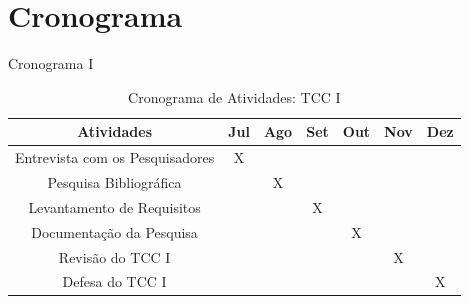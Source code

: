 

\section{Cronograma}
\label{sec:cronograma}

\begin{frame}{Cronograma I}
	\begin{table}[h]
		\caption*{Cronograma de Atividades: TCC I}
		\centering
		\begin{tabular}{c c c c c c c} \hline
			\label{quad:cronograma-atividades-i}
			\textbf{Atividades}             & \textbf{Jul} & \textbf{Ago} & \textbf{Set} & \textbf{Out} & \textbf{Nov} & \textbf{Dez} \\ \hline
			Entrevista com os Pesquisadores & X            &              &              &              &              &              \\ \hline
			Pesquisa Bibliográfica          &              & X            &              &              &              &              \\ \hline
			Levantamento de Requisitos      &              &              & X            &              &              &              \\ \hline
			Documentação da Pesquisa        &              &              &              & X            &              &              \\ \hline
			Revisão do TCC I                &              &              &              &              & X            &              \\ \hline
			Defesa do TCC I                 &              &              &              &              &              & X            \\ \hline
		\end{tabular}
	\end{table}
\end{frame}

